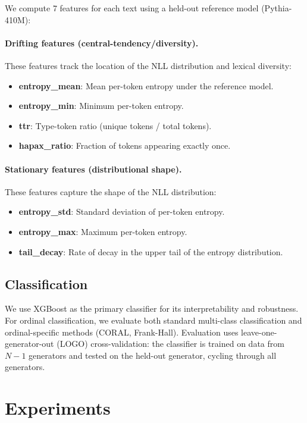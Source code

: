 \documentclass[11pt,a4paper]{article}
\begin{document}
We compute 7 features for each text using a held-out reference model (Pythia-410M):

\paragraph{Drifting features (central-tendency/diversity).} These features track the location of the NLL distribution and lexical diversity:
\begin{itemize}
    \item \textbf{entropy\_mean}: Mean per-token entropy under the reference model.
    \item \textbf{entropy\_min}: Minimum per-token entropy.
    \item \textbf{ttr}: Type-token ratio (unique tokens / total tokens).
    \item \textbf{hapax\_ratio}: Fraction of tokens appearing exactly once.
\end{itemize}

\paragraph{Stationary features (distributional shape).} These features capture the shape of the NLL distribution:
\begin{itemize}
    \item \textbf{entropy\_std}: Standard deviation of per-token entropy.
    \item \textbf{entropy\_max}: Maximum per-token entropy.
    \item \textbf{tail\_decay}: Rate of decay in the upper tail of the entropy distribution.
\end{itemize}

\subsection{Classification}

We use XGBoost as the primary classifier for its interpretability and robustness. For ordinal classification, we evaluate both standard multi-class classification and ordinal-specific methods (CORAL, Frank-Hall). Evaluation uses leave-one-generator-out (LOGO) cross-validation: the classifier is trained on data from $N-1$ generators and tested on the held-out generator, cycling through all generators.

\section{Experiments}
\end{document}
